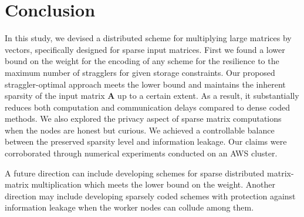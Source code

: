 \documentclass[conference]{IEEEtran}
\theoremstyle{definition}
\newcommand{\bfA}{\mathbf{A}}
\begin{document}




\section{Conclusion}
\label{sec:conclusion}


In this study, we devised a distributed scheme for multiplying large matrices by vectors, specifically designed for sparse input matrices. First we found a lower bound on the weight for the encoding of any scheme for the resilience to the maximum number of stragglers for given storage constraints. Our proposed straggler-optimal approach meets the lower bound and maintains the inherent sparsity of the input matrix $\bfA$ up to a certain extent. As a result, it substantially reduces both computation and communication delays compared to dense coded methods. We also explored the privacy aspect of sparse matrix computations when the nodes are honest but curious. We achieved a controllable balance between the preserved sparsity level and information leakage. Our claims were corroborated through numerical experiments conducted on an AWS cluster.

A future direction can include developing schemes for sparse distributed matrix-matrix multiplication which meets the lower bound on the weight. Another direction may include developing sparsely coded schemes with protection against information leakage when the worker nodes can collude among them.


\appendix
\end{document}
